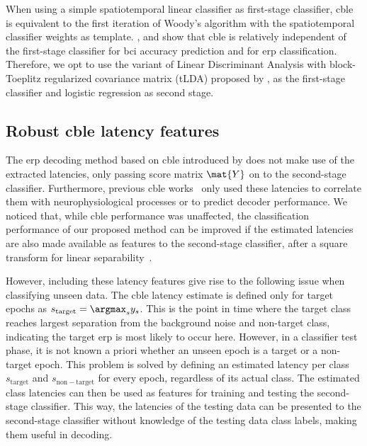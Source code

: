 When using a simple spatiotemporal linear classifier as first-stage classifier,
\ac{cble} is equivalent to the first iteration of Woody's algorithm with the
spatiotemporal classifier weights as template.
\cite{Thompson2012}, \cite{Mowla2017} and \cite{Mowla2020} show
that \ac{cble} is relatively independent of the first-stage classifier for \ac{bci}
accuracy prediction and for \ac{erp} classification.
Therefore, we opt to use the variant of Linear Discriminant Analysis with block-Toeplitz
regularized covariance matrix (tLDA) proposed by \cite{Sosulski2022}, as the first-stage
classifier and logistic regression as second stage.

\subsection{Robust \ac{cble} latency features}
\label{sec:robust-latency}
The \ac{erp} decoding method based on \ac{cble} introduced by \cite{Mowla2017} does
not make use of the extracted latencies, only passing score matrix $\mat{Y}$ on
to the second-stage classifier.
Furthermore, previous \ac{cble} works~\cite{Thompson2012,Mowla2020} only used these
latencies to correlate them with neurophysiological processes or to predict
decoder performance.
We noticed that, while \ac{cble} performance was unaffected, the classification
performance of our proposed method can be improved if the estimated
latencies are also made available as features to the second-stage classifier,
after a square transform for linear separability~\cite{Thompson2012}.

However, including these latency features give rise to the following issue when
classifying unseen data.
The \ac{cble} latency estimate is defined only for target epochs as
$s_\mathrm{target}=\argmax_s{y_s}$.
This is the point in time where the target class reaches largest separation
from the background noise and non-target class, indicating the target \ac{erp} is
most likely to occur here.
However, in a classifier test phase, it is not known a priori whether an
unseen epoch is a target or a non-target epoch.
This problem is solved by defining an estimated latency per class
$s_\mathrm{target}$ and $s_\mathrm{non-target}$ for every epoch,
regardless of its actual class.
The estimated class latencies can then be used as features  for training and
testing the second-stage classifier.
This way, the latencies of the testing data can be presented to the second-stage
classifier without knowledge of the testing data class labels, making them
useful in decoding.

